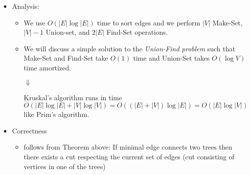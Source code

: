 \documentclass[11pt]{article}
\begin{document}
\begin{itemize}
\item Analysis: 
  \begin{itemize}
  \item We use $O(|E|\log |E|)$ time to sort edges and we perform
    $\vert V \vert$ {\sc Make-Set}, $\vert V \vert -1$ {\sc Union-set},
    and $2 \vert E \vert$ {\sc Find-Set} operations.
  \item We will discuss a simple solution to the \emph{Union-Find
    problem} such that {\sc Make-Set} and {\sc Find-Set} take $O(1)$
    time and {\sc Union-Set} takes $O(\log V)$ time amortized.
    
    $\Downarrow$
    
    Kruskal's algorithm runs in time $O(|E|\log |E| + |V|\log
    |V|)=O((|E|+|V|)\log |E|) = O(|E|\log |V|)$ like Prim's algorithm.
  \end{itemize}

\item Correctness 
  \begin{itemize}
  \item follows from Theorem above: If minimal edge connects two trees
  then there exists a cut respecting the current set of edges (cut
  consisting of vertices in one of the trees)
  \end{itemize}
  

\end{itemize}
\end{document}
